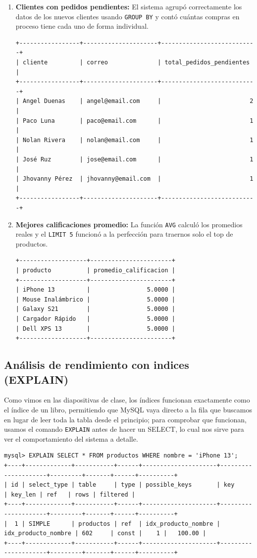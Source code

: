 \documentclass[10pt,letterpaper]{article}
\begin{document}
\begin{enumerate}
    \item \textbf{Clientes con pedidos pendientes:}
    El sistema agrup\'o correctamente los datos de los nuevos clientes usando \texttt{GROUP BY} y cont\'o cu\'antas compras en proceso tiene cada uno de forma individual.
\begin{verbatim}
+-----------------+---------------------+---------------------------+
| cliente         | correo              | total_pedidos_pendientes  |
+-----------------+---------------------+---------------------------+
| Angel Duenas    | angel@email.com     |                         2 |
| Paco Luna       | paco@email.com      |                         1 |
| Nolan Rivera    | nolan@email.com     |                         1 |
| José Ruz        | jose@email.com      |                         1 |
| Jhovanny Pérez  | jhovanny@email.com  |                         1 |
+-----------------+---------------------+---------------------------+
\end{verbatim}

    \item \textbf{Mejores calificaciones promedio:}
    La funci\'on \texttt{AVG} calcul\'o los promedios reales y el \texttt{LIMIT 5} funcion\'o a la perfecci\'on para traernos solo el top de productos.
\begin{verbatim}
+-------------------+-----------------------+
| producto          | promedio_calificacion |
+-------------------+-----------------------+
| iPhone 13         |                5.0000 |
| Mouse Inalámbrico |                5.0000 |
| Galaxy S21        |                5.0000 |
| Cargador Rápido   |                5.0000 |
| Dell XPS 13       |                5.0000 |
+-------------------+-----------------------+
\end{verbatim}
\end{enumerate}

\subsection{An\'alisis de rendimiento con indices (EXPLAIN)}
Como vimos en las diapositivas de clase, los \'indices funcionan exactamente como el \'indice de un libro, permitiendo que MySQL vaya directo a la fila que buscamos en lugar de leer toda la tabla desde el principio; para comprobar que funcionan, usamos el comando \texttt{EXPLAIN} antes de hacer un SELECT, lo cual nos sirve para ver el comportamiento del sistema a detalle.

\begin{verbatim}
mysql> EXPLAIN SELECT * FROM productos WHERE nombre = 'iPhone 13';
+----+-------------+-----------+------+---------------------+---------------------+---------+-------+------+----------+
| id | select_type | table     | type | possible_keys       | key                 | key_len | ref   | rows | filtered |
+----+-------------+-----------+------+---------------------+---------------------+---------+-------+------+----------+
|  1 | SIMPLE      | productos | ref  | idx_producto_nombre | idx_producto_nombre | 602     | const |    1 |   100.00 |
+----+-------------+-----------+------+---------------------+---------------------+---------+-------+------+----------+
\end{verbatim}
\end{document}
